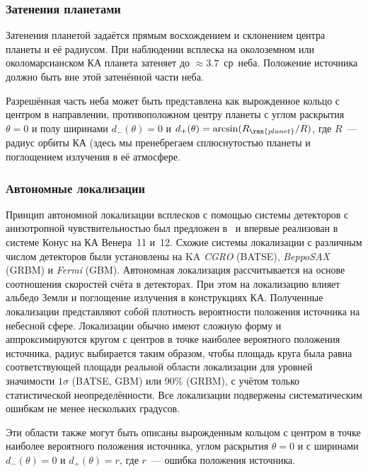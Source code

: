 \subsubsection{Затенения планетами}
Затенения планетой задаётся прямым восхождением и склонением центра планеты и её
радиусом. При наблюдении всплеска на околоземном или околомарсианском КА планета
затеняет до $\approx 3.7$~ср~неба. Положение источника должно быть вне этой 
затенённой части неба.

Разрешённая часть неба может быть представлена как вырожденное кольцо с центром
в направлении, противоположном центру планеты с углом раскрытия $\theta =0$ и 
полу ширинами $d_{-}(\theta) = 0$ и $d_{+}(\theta)= \arcsin(R_{\rmn{planet}}/R)$, 
где $R$~--- радиус орбиты КА (здесь мы пренебрегаем сплюснутостью планеты 
и поглощением излучения в её атмосфере.

\subsubsection{Автономные локализации}
Принцип автономной локализации всплесков с помощью системы детекторов с анизотропной 
чувствительностью был предложен в~\citep{Golenetskii_1974CosRe} и впервые реализован 
в системе Конус на КА Венера~11 и~12\citep{Mazets_1981ApSS}. Схожие системы локализации 
с различным числом детекторов были установлены на KA \textit{CGRO} (BATSE), 
\textit{BeppoSAX} (GRBM) и \textit{Fermi} (GBM). Автономная локализация рассчитывается 
на основе соотношения скоростей счёта в детекторах. При этом на локализацию влияет 
альбедо Земли и поглощение излучения в конструкциях КА. Полученные локализации 
представляют собой плотность вероятности положения источника на небесной сфере. 
Локализации обычно имеют сложную форму и аппроксимируются кругом с центров в точке 
наиболее вероятного положения источника, радиус выбирается таким образом, 
чтобы площадь круга была равна соответствующей площади реальной области локализации 
для уровней значимости $1\sigma$ (BATSE, GBM) или 90\% (GRBM), с учётом только 
статистической неопределённости. Все локализации подвержены систематическим ошибкам 
не менее нескольких градусов.

Эти области также могут быть описаны вырожденным кольцом с центром в точке
наиболее вероятного положения источника, углом раскрытия $\theta =0$ и с ширинами 
$d_{-}(\theta) = 0$ и $d_{+}(\theta)= r$, где $r$~--- ошибка положения источника.


